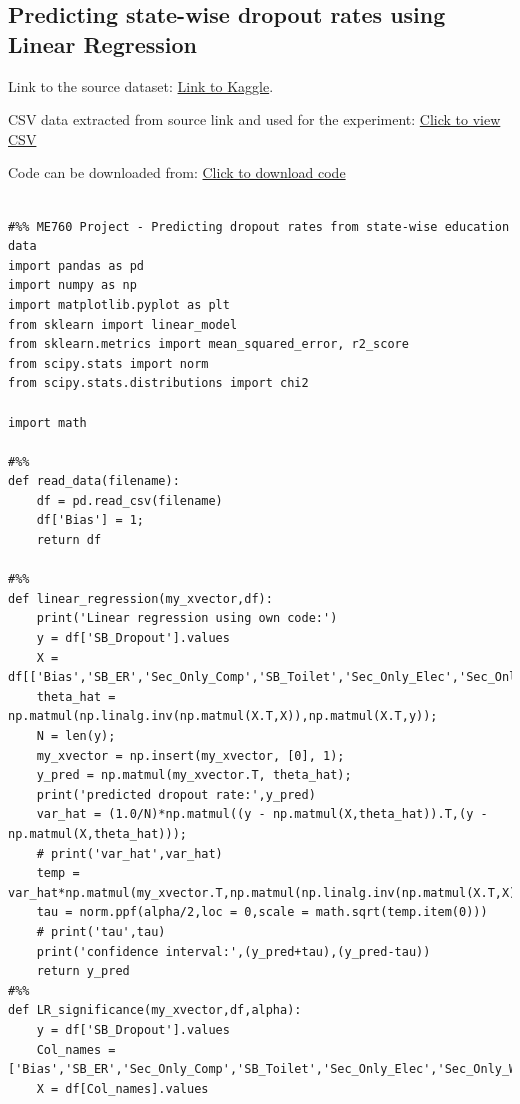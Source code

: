 \documentclass{article}
\begin{document}
\pagebreak
\begin{appendices}
\section{Predicting state-wise dropout rates using Linear Regression}
Link to the source dataset: \href{https://www.kaggle.com/vidyapb/indian-school-education-statistics}{Link to Kaggle}. 

CSV data extracted from source link and used for the experiment: \href{https://uwprod-my.sharepoint.com/:x:/g/personal/ssridhara_wisc_edu/Ebu49ou21lVCi4geyN82jpkBzErhT8QkI6XciYx0ed4Cag?e=ExgZ3z}{Click to view CSV}

Code can be downloaded from: \href{https://uwprod-my.sharepoint.com/:u:/g/personal/ssridhara_wisc_edu/EfNbW01wZB1Mof3OfQNlCnsBtZ9gEOjOHpKBEzsP9nn7GA?e=kRUuxN}{Click to download code}
\\
\begin{lstlisting}

#%% ME760 Project - Predicting dropout rates from state-wise education data
import pandas as pd
import numpy as np
import matplotlib.pyplot as plt
from sklearn import linear_model
from sklearn.metrics import mean_squared_error, r2_score
from scipy.stats import norm
from scipy.stats.distributions import chi2

import math

#%%
def read_data(filename):
    df = pd.read_csv(filename)
    df['Bias'] = 1;
    return df

#%%
def linear_regression(my_xvector,df):
    print('Linear regression using own code:')
    y = df['SB_Dropout'].values
    X = df[['Bias','SB_ER','Sec_Only_Comp','SB_Toilet','Sec_Only_Elec','Sec_Only_Water']].values
    theta_hat = np.matmul(np.linalg.inv(np.matmul(X.T,X)),np.matmul(X.T,y));
    N = len(y);
    my_xvector = np.insert(my_xvector, [0], 1);
    y_pred = np.matmul(my_xvector.T, theta_hat);
    print('predicted dropout rate:',y_pred)
    var_hat = (1.0/N)*np.matmul((y - np.matmul(X,theta_hat)).T,(y - np.matmul(X,theta_hat)));
    # print('var_hat',var_hat)
    temp = var_hat*np.matmul(my_xvector.T,np.matmul(np.linalg.inv(np.matmul(X.T,X)),my_xvector));
    tau = norm.ppf(alpha/2,loc = 0,scale = math.sqrt(temp.item(0)))
    # print('tau',tau)
    print('confidence interval:',(y_pred+tau),(y_pred-tau))
    return y_pred
#%%
def LR_significance(my_xvector,df,alpha):
    y = df['SB_Dropout'].values
    Col_names = ['Bias','SB_ER','Sec_Only_Comp','SB_Toilet','Sec_Only_Elec','Sec_Only_Water']
    X = df[Col_names].values


\end{lstlisting}
\end{appendices}
\end{document}
